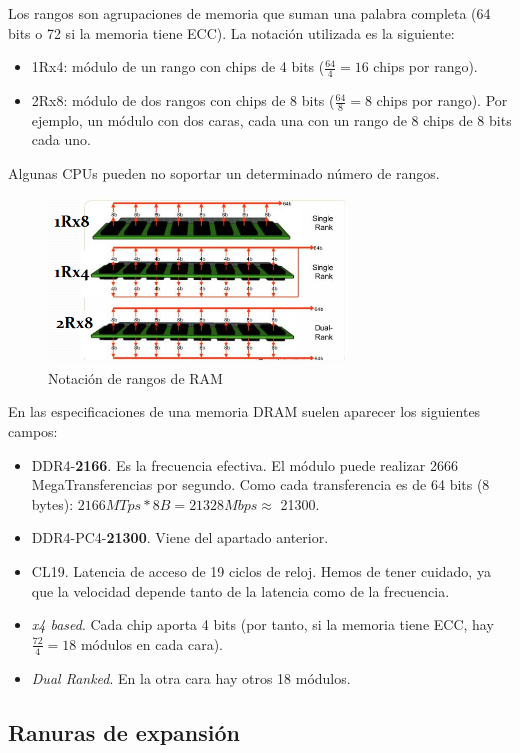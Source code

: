 \documentclass[12pt,spanish]{article}
\begin{document}
Los rangos son agrupaciones de memoria que suman una palabra completa (64 bits o 72 si la memoria tiene ECC). La notación utilizada es la siguiente:
\begin{itemize}
	\item 1Rx4: módulo de un rango con chips de 4 bits ($\frac{64}{4}= 16$ chips por rango).
	\item 2Rx8: módulo de dos rangos con chips de 8 bits ($\frac{64}{8}= 8$ chips por rango). Por ejemplo, un módulo con dos caras, cada una con un rango de 8 chips de 8 bits cada uno.
\end{itemize}

Algunas CPUs pueden no soportar un determinado número de rangos.

\begin{figure}[H]
	\centering
	\includegraphics[width=0.7\textwidth]{ramranks.png}
	\caption{Notación de rangos de RAM}
\end{figure}

En las especificaciones de una memoria DRAM suelen aparecer los siguientes campos:
\begin{itemize}
	\item DDR4-\textbf{2166}. Es la frecuencia efectiva. El módulo puede realizar 2666 MegaTransferencias por segundo. Como cada transferencia es de 64 bits (8 bytes): $2166 MTps * 8 B= 21328Mbps \approx$ 21300.
	\item DDR4-PC4-\textbf{21300}. Viene del apartado anterior.
	\item CL19. Latencia de acceso de 19 ciclos de reloj. Hemos de tener cuidado, ya que la velocidad depende tanto de la latencia como de la frecuencia.
	\item \textit{x4 based}. Cada chip aporta 4 bits (por tanto, si la memoria tiene ECC, hay $\frac{72}{4}=18$ módulos en cada cara).
	\item \textit{Dual Ranked}. En la otra cara hay otros 18 módulos.
\end{itemize}

\subsection{Ranuras de expansión}
\end{document}
